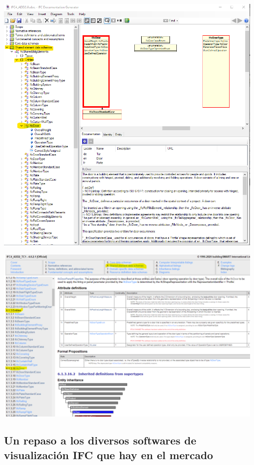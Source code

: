 \documentclass[spanish,10pt,a4paper,final,oneside]{article}
\begin{document}
\vspace{1cm}

\includegraphics[width=\textwidth]{ifcDOC vs web - pantallazo ifcDOC}

\includegraphics[width=\textwidth]{ifcDOC vs web - pantallazo web}



\subsection{Un repaso a los diversos softwares de visualización IFC que hay en el mercado}
\end{document}
